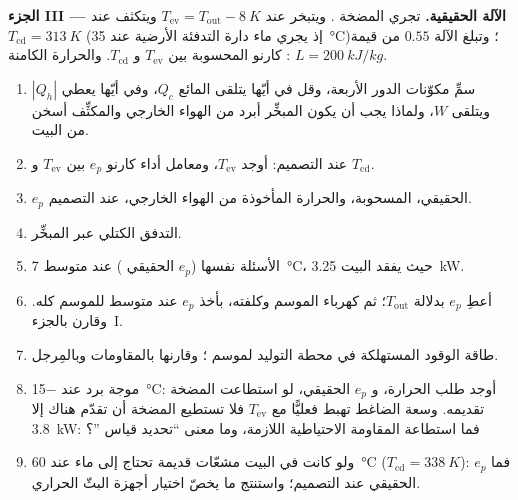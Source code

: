 \begin{problem}
\medskip
\noindent\textbf{الجزء III --- الآلة الحقيقية.}
تجري المضخة . ويتبخر  عند
$T_{\mathrm{ev}} = T_{\mathrm{out}} - \qty{8}{K}$ ويتكثف عند
$T_{\mathrm{cd}} = \qty{313}{K}$ (إذ يجري ماء دارة التدفئة الأرضية عند
\qty{35}{\degreeCelsius})؛ وتبلغ الآلة $0.55$ من قيمة كارنو
المحسوبة بين $T_{\mathrm{ev}}$ و $T_{\mathrm{cd}}$. والحرارة الكامنة
: $L = \qty{200}{kJ/kg}$.
\begin{enumerate}[resume]
  \item سمِّ مكوّنات الدور الأربعة، وقل في أيّها يتلقى المائع
        $Q_c$، وفي أيّها يعطي $|Q_h|$ ويتلقى $W$، ولماذا يجب أن يكون
        المبخِّر أبرد من الهواء الخارجي والمكثِّف
        أسخن من البيت.
  \item عند  التصميم: أوجد $T_{\mathrm{ev}}$، ومعامل أداء كارنو $e_p$
        بين $T_{\mathrm{ev}}$ و $T_{\mathrm{cd}}$.
  \item $e_p$ الحقيقي،  المسحوبة، والحرارة المأخوذة من
        الهواء الخارجي، عند  التصميم.
  \item التدفق الكتلي  عبر المبخِّر.
  \item الأسئلة نفسها ($e_p$ الحقيقي ) عند متوسط
         \qty{7}{\degreeCelsius}، حيث يفقد البيت
        \qty{3.25}{kW}.
  \item أعطِ $e_p$ بدلالة $T_{\mathrm{out}}$؛ ثم كهرباء الموسم
        وكلفته، بأخذ $e_p$ عند متوسط  للموسم كله.
        وقارن بالجزء~I.
  \item طاقة الوقود المستهلكة في محطة التوليد لموسم ؛ وقارنها بالمقاومات وبالمِرجل.
  \item موجة برد عند \qty{-15}{\degreeCelsius}: أوجد طلب الحرارة، و $e_p$ الحقيقي،
         لو استطاعت المضخة تقديمه. وسعة الضاغط
        تهبط فعليًّا مع $T_{\mathrm{ev}}$ فلا تستطيع المضخة أن
        تقدّم هناك إلا \qty{3.8}{kW}: فما استطاعة المقاومة الاحتياطية اللازمة، وما
        معنى ``تحديد قياس ''؟
  \item ولو كانت في البيت مشعّات قديمة تحتاج إلى ماء عند
        \qty{60}{\degreeCelsius} ($T_{\mathrm{cd}} = \qty{338}{K}$): فما $e_p$ الحقيقي
         عند  التصميم؛ واستنتج ما يخصّ
        اختيار أجهزة البثّ الحراري.
\end{enumerate}


\end{problem}
